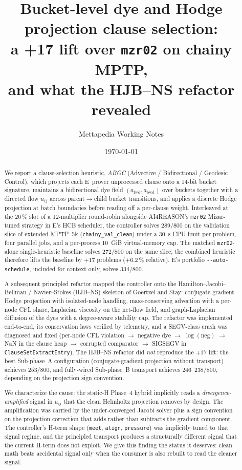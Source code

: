 \documentclass[11pt]{article}
\title{Bucket-level dye and Hodge projection clause selection:\\
       a +17 lift over \texttt{mzr02} on chainy MPTP,\\
       and what the HJB--NS refactor revealed}
\author{Mettapedia Working Notes}
\date{\today}
\newcommand{\lpath}[1]{\texttt{\nolinkurl{#1}}}
\newcommand{\lid}[1]{{\ttfamily\nolinkurl{#1}}}
\begin{document}
\maketitle

\begin{abstract}
We report a clause-selection heuristic, \emph{ABGC} (Advective / Bidirectional /
Geodesic Control), which projects each E~prover unprocessed clause onto a
14-bit bucket signature, maintains a bidirectional dye field
$(a_\mathrm{fwd}, a_\mathrm{bwd})$ over buckets together with a directed flow
$u_{ij}$ across parent$\!\to\!$child bucket transitions, and applies a discrete
Hodge projection at batch boundaries before reading off a per-clause weight.
Interleaved at the 20\,\% slot of a 12-multiplier round-robin alongside
AI4REASON's \texttt{mzr02} Mizar-tuned strategy in E's HCB scheduler, the
controller solves $289/800$ on the validation slice of extended MPTP~5k
(\lpath{chainy_val_clean}) under a 30~s CPU limit per problem, four parallel
jobs, and a per-process 10~GiB virtual-memory cap. The matched
\texttt{mzr02}-alone single-heuristic baseline solves $272/800$ on the same
slice; the combined heuristic therefore lifts the baseline by $+17$ problems
($+6.2\,\%$ relative). E's portfolio \lid{--auto-schedule}, included for
context only, solves $334/800$.

A subsequent principled refactor mapped the controller onto the
Hamilton--Jacobi--Bellman / Navier--Stokes (HJB--NS) skeleton of
Goertzel and Stay: conjugate-gradient Hodge projection with isolated-node
handling, mass-conserving advection with a per-node CFL share, Laplacian
viscosity on the net-flow field, and graph-Laplacian diffusion of the dyes
with a degree-aware stability cap. The refactor was implemented end-to-end,
its conservation laws verified by telemetry, and a SEGV-class crash was
diagnosed and fixed (per-node CFL violation $\to$ negative dye $\to$
$\log(\mathrm{neg})$ $\to$ NaN in the clause heap $\to$ corrupted comparator
$\to$ SIGSEGV in \lid{ClauseSetExtractEntry}). The HJB--NS refactor did
\emph{not} reproduce the $+17$ lift: the best Sub-phase~A configuration
(conjugate-gradient projection without transport) achieves $253/800$, and
fully-wired Sub-phase~B transport achieves $246$--$238/800$, depending on
the projection sign convention.

We characterize the cause: the static-H Phase~4 hybrid implicitly reads a
\emph{divergence-amplified} signal in $u_{ij}$ that the clean Helmholtz
projection removes by design. The amplification was carried by the
under-converged Jacobi solver plus a sign convention on the projection
correction that adds rather than subtracts the gradient component. The
controller's H-term shape (\lid{meet}, \lid{align}, \lid{pressure}) was
implicitly tuned to that signal regime, and the principled transport
produces a structurally different signal that the current H-term does
not exploit. We give this finding the status it deserves: clean math
beats accidental signal only when the consumer is also rebuilt to read
the cleaner signal.
\end{abstract}
\end{document}
